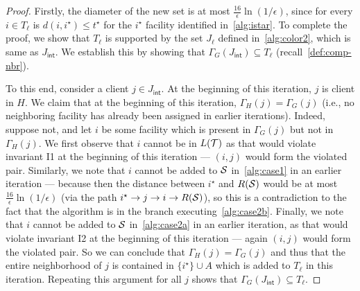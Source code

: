\begin{proof}
Firstly, the diameter of the new set is at most $\frac{16}{\epsilon}\ln(1/\epsilon)$, since for every $i \in T_\ell$ is $d(i,i^\star) \leq t^\star$ for the  $i^\star$ facility identified in~\cref{alg:istar}. To complete the proof, we show that $T_\ell$ is supported by the set $J_\ell$ defined in~\cref{alg:color2}, which is same as $J_\mathsf{int}$. %
We establish this by showing that $\Gamma_G(J_\mathsf{int}) \subseteq T_\ell$ (recall~\cref{def:comp-nbr}).

To this end, consider a client $j \in J_\mathsf{int}$. At the beginning of this iteration, $j$ is client  in $H$.
We claim that at the beginning of this iteration, $\Gamma_H(j) = \Gamma_G(j)$ (i.e., no neighboring facility has already been assigned in earlier iterations). Indeed, suppose not, and let $i$ be some facility which is present in $\Gamma_G(j)$ but not in $\Gamma_H(j)$. We first observe that $i$ cannot be in $L({\cal T})$ as that would violate invariant I1 at the beginning of this iteration --- $(i,j)$ would form the violated pair. Similarly, we note that $i$ cannot be added to ${\cal S}$ in~\cref{alg:case1} in an earlier iteration --- because then the distance between $i^\star$ and $R({\cal S})$ would be at most $\frac{16}{\epsilon}\ln(1/\epsilon)$ (via the path $i^\star \rightarrow j \rightarrow i \rightarrow R({\cal S})$), so this is a contradiction to the fact that the algorithm is in the branch executing~\cref{alg:case2b}. Finally, we note that $i$ cannot be added to ${\cal S}$ in~\cref{alg:case2a} in an earlier iteration, as that would violate invariant I2 at the beginning of this iteration --- again $(i,j)$ would form the violated pair.
So we can conclude that $\Gamma_H(j) = \Gamma_G(j)$ and thus that the entire neighborhood of $j$ is contained in $\{i^\star\} \cup A$ which is added to $T_\ell$ in this iteration. Repeating this argument for all $j$ shows that $\Gamma_G(J_\mathsf{int}) \subseteq T_\ell$.
\end{proof}

